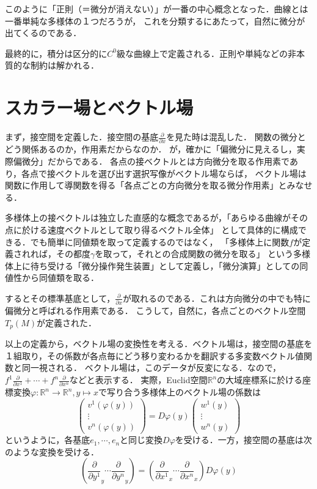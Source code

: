 \documentclass[uplatex, dvipdfmx]{jsreport}
\begin{document}
このように「正則（＝微分が消えない）」が一番の中心概念となった．曲線とは一番単純な多様体の１つだろうが，
これを分類するにあたって，自然に微分が出てくるのである．

最終的に，積分は区分的に$C^0$級な曲線上で定義される．正則や単純などの非本質的な制約は解かれる．

\section{スカラー場とベクトル場}

まず，接空間を定義した．接空間の基底$\frac{\partial}{\partial x}$を見た時は混乱した．
関数の微分とどう関係あるのか，作用素だからなのか．
が，確かに「偏微分に見えるし，実際偏微分」だからである．
各点の接ベクトルとは方向微分を取る作用素であり，各点で接ベクトルを選び出す選択写像がベクトル場ならば，
ベクトル場は関数に作用して導関数を得る「各点ごとの方向微分を取る微分作用素」とみなせる．

多様体上の接ベクトルは独立した直感的な概念であるが，「あらゆる曲線がその点に於ける速度ベクトルとして取り得るベクトル全体」
として具体的に構成できる．でも簡単に同値類を取って定義するのではなく，
「多様体上に関数$f$が定義されれば，その都度$\gamma$を取って，それとの合成関数の微分を取る」
という多様体上に待ち受ける「微分操作発生装置」として定義し，「微分演算」としての同値性から同値類を取る．

するとその標準基底として，$\frac{\partial}{\partial x}$が取れるのである．これは方向微分の中でも特に偏微分と呼ばれる作用素である．
こうして，自然に，各点ごとのベクトル空間$T_p(M)$が定義された．

以上の定義から，ベクトル場の変換性を考える．ベクトル場は，接空間の基底を１組取り，その係数が各点毎にどう移り変わるかを翻訳する多変数ベクトル値関数と同一視される．
ベクトル場は，このデータが反変になる．なので，$f^1\frac{\partial}{\partial x^1}+\cdots +f^n\frac{\partial}{\partial x^n}$などと表示する．
実際，Euclid空間$\mathbb{R}^n$の大域座標系に於ける座標変換$\varphi:\mathbb{R}^n\to\mathbb{R}^n, y\mapsto x$で写り合う多様体上のベクトル場の係数は
\[ \begin{pmatrix}v^1(\varphi(y))\\\vdots\\v^n(\varphi(y))\end{pmatrix} = D\varphi(y)\begin{pmatrix}w^1(y)\\\vdots\\w^n(y)\end{pmatrix} \]
というように，各基底$e_1,\cdots,e_n$と同じ変換$D\varphi$を受ける．一方，接空間の基底は次のような変換を受ける．
\[\left( \frac{\partial}{\partial y^1}_y \cdots \frac{\partial}{\partial y^n}_y \right) = \left( \frac{\partial}{\partial x^1}_x \cdots \frac{\partial}{\partial x^n}_x \right)D\varphi(y)\]
\end{document}
